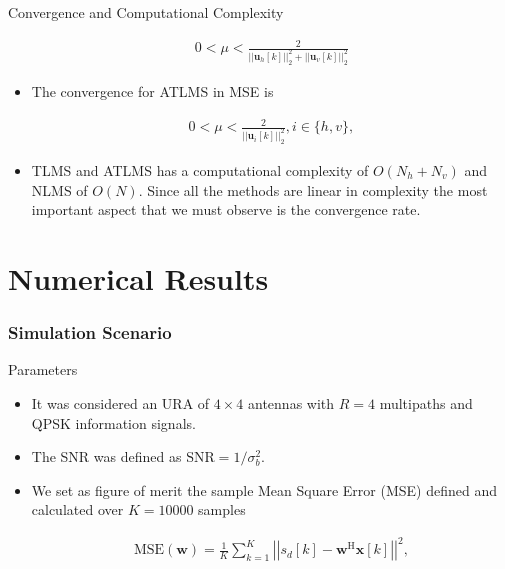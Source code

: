\documentclass[10pt]{beamer}
\begin{document}
\begin{frame}[allowframebreaks]
\begin{block}{Convergence and Computational Complexity}
\begin{itemize}
                \begin{align}
                    0 < \mu < \frac{2}{\left|\left|\boldsymbol{u}_{h}[k]\right|\right|^{2}_{2} + \left|\left|\boldsymbol{u}_{v}[k]\right|\right|^{2}_{2}}
                \end{align}
            
            \item The convergence for ATLMS in MSE is
            
                \begin{align}
                    0 < \mu < \frac{2}{\left|\left|\boldsymbol{u}_{i}[k]\right|\right|^{2}_{2}}, i \in \{h,v\},
                \end{align}
            
            \item TLMS and ATLMS has a computational complexity of $O(N_{h} + N_{v})$ and NLMS of $O(N)$. Since all the methods are linear in complexity
            the most important aspect that we must observe is the convergence rate.

        \end{itemize}
    \end{block}
\end{frame}

\section{Numerical Results}
\begin{frame}
    \frametitle{Simulation Scenario}
    \begin{block}{Parameters}
        \begin{itemize}
            
            \item It was considered an URA of $4 \times 4$ antennas with $R = 4$ multipaths and QPSK information signals.
            
            \item The SNR was defined as $\text{SNR} = 1/\sigma^{2}_{b}$.

            \item We set as figure of merit the sample Mean Square Error (MSE) defined and calculated over $K = 10000$ samples
            
                \begin{align}
                    \text{MSE}(\boldsymbol{w}) = \frac{1}{K} \sum^{K}_{k = 1} \left|\left| s_{d}[k] - \boldsymbol{w}^{\text{H}} \boldsymbol{x}[k] \right|\right|^{2},
                \end{align}

        \end{itemize}
    \end{block}
\end{frame}
\end{document}
